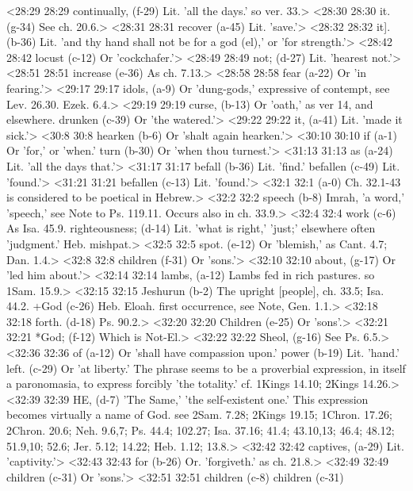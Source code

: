 <28:29 28:29  continually, (f-29)  Lit. 'all the days.' so ver. 33.>
<28:30 28:30  it. (g-34)  See ch. 20.6.>
<28:31 28:31  recover (a-45)  Lit. 'save.'>
<28:32 28:32  it]. (b-36)  Lit. 'and thy hand shall not be for a god (el),' or 'for  strength.'>
<28:42 28:42  locust (c-12)  Or 'cockchafer.'>
<28:49 28:49  not; (d-27)  Lit. 'hearest not.'>
<28:51 28:51  increase (e-36)  As ch. 7.13.>
<28:58 28:58  fear (a-22)  Or 'in fearing.'>
<29:17 29:17  idols, (a-9)  Or 'dung-gods,' expressive of contempt, see Lev. 26.30. Ezek. 6.4.>
<29:19 29:19  curse, (b-13)  Or 'oath,' as ver 14, and elsewhere.  drunken (c-39)  Or 'the watered.'>
<29:22 29:22  it, (a-41)  Lit. 'made it sick.'>
<30:8 30:8  hearken (b-6)  Or 'shalt again hearken.'>
<30:10 30:10  if (a-1)  Or 'for,' or 'when.'
  turn (b-30)  Or 'when thou turnest.'>
<31:13 31:13  as (a-24)  Lit. 'all the days that.'>
<31:17 31:17  befall (b-36)  Lit. 'find.'
  befallen (c-49) Lit. 'found.'>
<31:21 31:21  befallen (c-13)  Lit. 'found.'>
<32:1 32:1   (a-0)  Ch. 32.1-43 is considered to be poetical in Hebrew.>
<32:2 32:2  speech (b-8)  Imrah, 'a word,' 'speech,' see Note to Ps. 119.11. Occurs  also in ch. 33.9.>
<32:4 32:4  work (c-6)  As Isa. 45.9.
  righteousness; (d-14)  Lit. 'what is right,' 'just;' elsewhere often 'judgment.'  Heb. mishpat.>
<32:5 32:5  spot. (e-12)  Or 'blemish,' as Cant. 4.7; Dan. 1.4.>
<32:8 32:8  children (f-31)  Or 'sons.'>
<32:10 32:10  about, (g-17)  Or 'led him about.'>
<32:14 32:14  lambs, (a-12)  Lambs fed in rich pastures. so 1Sam. 15.9.>
<32:15 32:15  Jeshurun (b-2)  The upright [people], ch. 33.5; Isa. 44.2.
  +God (c-26)  Heb. Eloah. first occurrence, see Note, Gen. 1.1.>
<32:18 32:18  forth. (d-18)  Ps. 90.2.>
<32:20 32:20  Children (e-25)  Or 'sons'.>
<32:21 32:21  *God; (f-12)  Which is Not-El.>
<32:22 32:22  Sheol, (g-16)  See Ps. 6.5.>
<32:36 32:36  of (a-12)  Or 'shall have compassion upon.'
  power (b-19)  Lit. 'hand.'
  left. (c-29)  Or 'at liberty.' The phrase seems to be a proverbial  expression, in itself a paronomasia, to express forcibly 'the  totality.' cf. 1Kings 14.10; 2Kings 14.26.>
<32:39 32:39  HE, (d-7)  'The Same,' 'the self-existent one.' This expression  becomes virtually a name of God. see 2Sam. 7.28; 2Kings 19.15;  1Chron. 17.26; 2Chron. 20.6; Neh. 9.6,7; Ps. 44.4; 102.27; Isa.  37.16; 41.4; 43.10,13; 46.4; 48.12; 51.9,10; 52.6; Jer. 5.12;  14.22; Heb. 1.12; 13.8.>
<32:42 32:42  captives, (a-29)  Lit. 'captivity.'>
<32:43 32:43  for (b-26)  Or. 'forgiveth.' as ch. 21.8.>
<32:49 32:49  children (c-31) Or 'sons.'>
<32:51 32:51  children (c-8)  children (c-31)
